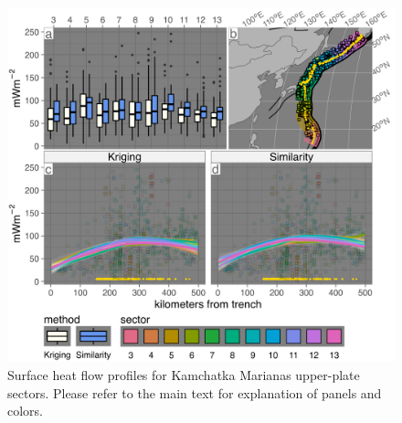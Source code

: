 \begin{figure}[htbp]

{\centering \includegraphics[width=1\linewidth,]{assets/figs/chpt3/kamchatkaMarianasUpperPlate} 

}

\caption[Surface heat flow profiles for Kamchatka Marianas upper-plate sectors]{Surface heat flow profiles for Kamchatka Marianas upper-plate sectors. Please refer to the main text for explanation of panels and colors.}\label{fig:kamchatkaMarianasUpper}
\end{figure}


